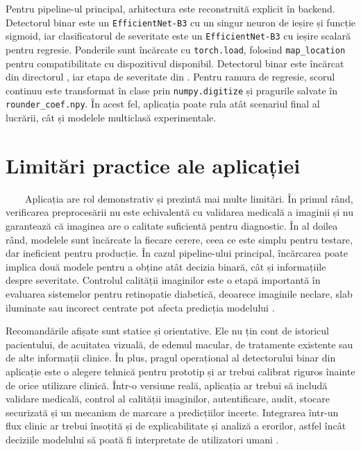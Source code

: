 \documentclass[12pt, a4paper, twoside, romanian]{teza-upb}
\begin{document}
Pentru pipeline-ul principal, arhitectura este reconstruită explicit în backend. Detectorul binar este
un \texttt{EfficientNet-B3} cu un singur neuron de ieșire și funcție sigmoid, iar clasificatorul de
severitate este un \texttt{EfficientNet-B3} cu ieșire scalară pentru regresie. Ponderile sunt încărcate
cu \texttt{torch.load}, folosind \texttt{map\_location} pentru compatibilitate cu dispozitivul disponibil.
Detectorul binar este încărcat din directorul , iar etapa de severitate din
.
Pentru ramura de regresie, scorul continuu este transformat în clase prin \texttt{numpy.digitize} și
pragurile salvate în \texttt{rounder\_coef.npy}. În acest fel, aplicația poate rula atât scenariul final
al lucrării, cât și modelele multiclasă experimentale.

\section{Limitări practice ale aplicației}

\ \ \ \ Aplicația are rol demonstrativ și prezintă mai multe limitări. În primul rând,
verificarea preprocesării nu este echivalentă cu validarea medicală a imaginii și nu
garantează că imaginea are o calitate suficientă pentru diagnostic. În al doilea
rând, modelele sunt încărcate la fiecare cerere, ceea ce este simplu pentru
testare, dar ineficient pentru producție. În cazul pipeline-ului principal, încărcarea poate implica
două modele pentru a obține atât decizia binară, cât și informațiile despre severitate. Controlul calității imaginilor este o etapă importantă
în evaluarea sistemelor pentru retinopatie diabetică, deoarece imaginile neclare, slab iluminate sau
incorect centrate pot afecta predicția modelului \cite{14_liu2022deepdrid}.
\bigskip

Recomandările afișate sunt statice și orientative. Ele nu țin cont de istoricul
pacientului, de acuitatea vizuală, de edemul macular, de tratamente existente sau de
alte informații clinice. În plus, pragul operațional al detectorului binar din aplicație este o alegere
tehnică pentru prototip și ar trebui calibrat riguros înainte de orice utilizare clinică. Într-o
versiune reală, aplicația ar trebui să includă validare medicală, control al calității imaginilor,
autentificare, audit, stocare securizată și un mecanism de marcare a predicțiilor incerte. Integrarea
într-un flux clinic ar trebui însoțită și de explicabilitate și analiză a erorilor, astfel încât
deciziile modelului să poată fi interpretate de utilizatori umani \cite{9_chetoui2020explainable}.
\end{document}

